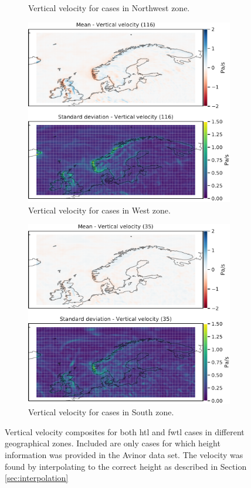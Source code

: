 \begin{figure}
\begin{subfigure}[b]{0.49\textwidth}
    \caption{Vertical velocity  for cases in Northwest zone.}
    \label{fig:NordWestW}
\end{subfigure}
\begin{subfigure}[b]{0.49\textwidth}
    \centering
    \includegraphics[width=\textwidth]{Figures/WVest.pdf}
    \caption{Vertical velocity  for cases in West zone.}
    \label{fig:WestW}
\end{subfigure}
\begin{subfigure}[b]{0.49\textwidth}
    \centering
    \includegraphics[width=\textwidth]{Figures/WSor.pdf}
    \caption{Vertical velocity  for cases in South zone.}
    \label{fig:SouthW}
\end{subfigure}
\caption{Vertical velocity composites for both \acrshort{htl} and \acrshort{fwtl} cases in different geographical zones. Included are only cases for which height information was provided in the Avinor data set. The velocity was found by interpolating to the correct height as described in Section \ref{sec:interpolation}}
\label{fig:verticalzones}
\end{figure}

